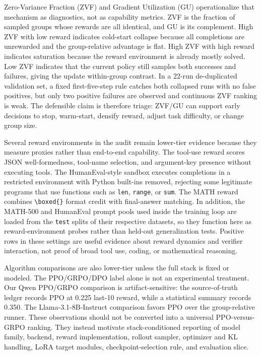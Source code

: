 \documentclass[12pt,a4paper]{report}
\begin{document}
Zero-Variance Fraction (ZVF) and Gradient Utilization (GU) operationalize that
mechanism as diagnostics, not as capability metrics.  ZVF is the fraction of
sampled groups whose rewards are all identical, and GU is its complement.  High
ZVF with low reward indicates cold-start collapse because all completions are
unrewarded and the group-relative advantage is flat.  High ZVF with high reward
indicates saturation because the reward environment is already mostly solved.
Low ZVF indicates that the current policy still samples both successes and
failures, giving the update within-group contrast.  In a 22-run de-duplicated
validation set, a fixed first-five-step rule catches both collapsed runs with no
false positives, but only two positive failures are observed and continuous ZVF
ranking is weak.  The defensible claim is therefore triage: ZVF/GU can support
early decisions to stop, warm-start, densify reward, adjust task difficulty, or
change group size.

Several reward environments in the audit remain lower-tier evidence because
they measure proxies rather than end-to-end capability.  The tool-use reward
scores JSON well-formedness, tool-name selection, and argument-key presence
without executing tools.  The HumanEval-style sandbox executes completions in a
restricted environment with Python built-ins removed, rejecting some legitimate
programs that use functions such as \texttt{len}, \texttt{range}, or
\texttt{sum}.  The MATH reward combines \texttt{\textbackslash boxed\{\}}
format credit with final-answer matching.  In addition, the MATH-500 and
HumanEval prompt pools used inside the training loop are loaded from the
\texttt{test} splits of their respective datasets, so they function here as
reward-environment probes rather than held-out generalization tests.  Positive
rows in these settings are useful evidence about reward dynamics and verifier
interaction, not proof of broad tool use, coding, or mathematical reasoning.

Algorithm comparisons are also lower-tier unless the full stack is fixed or
modeled.  The PPO/GRPO/DPO label alone is not an experimental treatment.  Our
Qwen PPO/GRPO comparison is artifact-sensitive: the source-of-truth ledger
records PPO at 0.225 last-10 reward, while a statistical summary records 0.350.
The Llama-3.1-8B-Instruct comparison favors PPO over the group-relative runner.
These observations should not be converted into a universal PPO-versus-GRPO
ranking.  They instead motivate stack-conditioned reporting of model family,
backend, reward implementation, rollout sampler, optimizer and KL handling,
LoRA target modules, checkpoint-selection rule, and evaluation slice.
\end{document}
